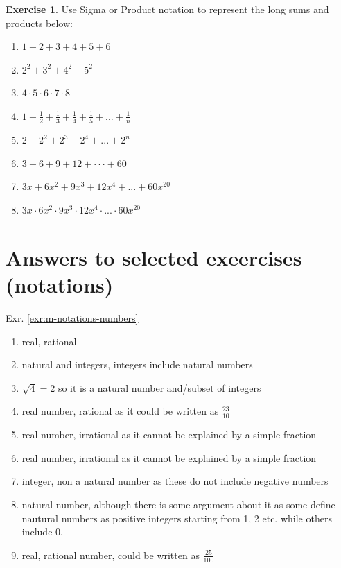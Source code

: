 \documentclass[
]{book}
\providecommand{\tightlist}{%
  \setlength{\itemsep}{0pt}\setlength{\parskip}{0pt}}
\theoremstyle{definition}
\theoremstyle{definition}
\theoremstyle{definition}
\newtheorem{exercise}{Exercise}[chapter]
\theoremstyle{remark}
\begin{document}
\begin{exercise}
\protect\hypertarget{exr:m-notations-sigma-product-reverse}{}{\label{exr:m-notations-sigma-product-reverse} }
Use Sigma or Product notation to represent the long sums and products below:

\begin{enumerate}
\def\labelenumi{\alph{enumi})}
\tightlist
\item
  \(1+2+3+4+5+6\)
\item
  \(2^2+3^2+4^2+5^2\)
\item
  \(4 \cdot 5 \cdot 6 \cdot 7 \cdot 8\)
\item
  \(1 + \frac{1}{2} + \frac{1}{3} + \frac{1}{4} + \frac{1}{5} +...+ \frac{1}{n}\)
\item
  \(2-2^2+2^3-2^4 + ...+2^n\)
\item
  \(3+6+9+12+···+60\)
\item
  \(3x + 6x^2 + 9x^3 + 12x^4 +...+60x^{20}\)
\item
  \(3x \cdot 6x^2 \cdot 9x^3 \cdot 12x^4 \cdot...\cdot 60x^{20}\)
\end{enumerate}
\end{exercise}

\hypertarget{answers-to-selected-exeercises-notations}{%
\section*{Answers to selected exeercises (notations)}\label{answers-to-selected-exeercises-notations}}

Exr. \ref{exr:m-notations-numbers}

\begin{enumerate}
\def\labelenumi{\alph{enumi})}
\tightlist
\item
  real, rational
\item
  natural and integers, integers include natural numbers
\item
  \(\sqrt{4} = 2\) so it is a natural number and/subset of integers
\item
  real number, rational as it could be written as \(\frac{23}{10}\)
\item
  real number, irrational as it cannot be explained by a simple fraction
\item
  real number, irrational as it cannot be explained by a simple fraction
\item
  integer, non a natural number as these do not include negative numbers
\item
  natural number, although there is some argument about it as some define nautural numbers as positive integers starting from 1, 2 etc. while others include 0.
\item
  real, rational number, could be written as \(\frac{25}{100}\)
\end{enumerate}
\end{document}
